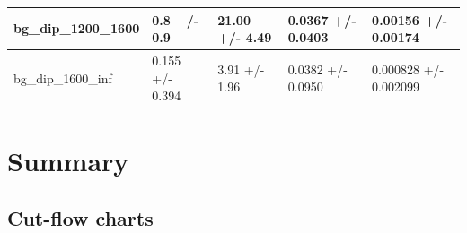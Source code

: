 \documentclass[a4paper, 10pt]{article}
\begin{document}
\begin{table}[H]
\begin{center}
\begin{tabular}{|m{20.0mm}|m{27.0mm}|m{27.0mm}|m{33.0mm}|m{32.0mm}|}
      \hline
      {\cellcolor{white}         bg\_dip\_1200\_1600}& {\cellcolor{white}         0.8 +/\-- 0.9}& {\cellcolor{white}         21.00 +/\-- 4.49}& {\cellcolor{white}         0.0367 +/\-- 0.0403}& {\cellcolor{white}         0.00156 +/\-- 0.00174}\\
      \hline
      {\cellcolor{white}         bg\_dip\_1600\_inf}& {\cellcolor{white}         0.155 +/\-- 0.394}& {\cellcolor{white}         3.91 +/\-- 1.96}& {\cellcolor{white}         0.0382 +/\-- 0.0950}& {\cellcolor{white}         0.000828 +/\-- 0.002099}\\
\hline
    \end{tabular}
  \end{center}
\end{table}

\newpage
\section{ Summary}

\subsection{Cut-flow charts}
\end{document}
